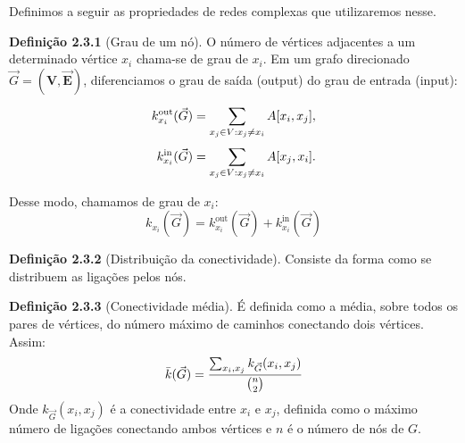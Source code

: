 \documentclass[12pt]{article}
\begin{document}
Definimos a seguir as propriedades de redes complexas que utilizaremos nesse.


\noindent \textbf{Definição 2.3.1} (Grau de um nó). O número de vértices adjacentes a um determinado vértice $x_i$ chama-se de grau de $x_i$. Em um grafo direcionado $\Vec G = (\bm V,\bm \Vec E)$, diferenciamos o grau de saída (output) do grau de entrada (input):
\begin{align}
k^{\text{\text{out}}}_{x_{i}}(\Vec{G}) &= \sum_{x_j \in V : x_j \neq x_i}^{} A[x_i,x_j]
\label{eq:grauOutput}, \\
k^{\text{in}}_{x_{i}}(\Vec{G}) &= \sum_{x_j \in V : x_j \neq x_i}^{} A[x_j,x_i].
\label{eq:grauInput}
\end{align}

Desse modo, chamamos de grau de $x_i$: 
\begin{equation}
k_{x_i}(\Vec{G}) = k^{\text{out}}_{x_{i}}(\Vec{G}) + k^{\text{in}}_{x_{i}}(\Vec{G})
\label{eq:grau}
\end{equation}

\noindent \textbf{Definição 2.3.2} (Distribuição da conectividade). Consiste da forma como se distribuem as ligações pelos nós.

\noindent \textbf{Definição 2.3.3} (Conectividade média). É definida como a média, sobre todos os pares de vértices, do número máximo de caminhos conectando dois vértices. Assim:
\begin{equation}
\Bar{k}(\Vec{G}) = \frac{\sum_{x_i, x_j}^{} k_{\Vec{G}}(x_i, x_j)}{{n \choose 2}}
\label{eq:grauInput}
\end{equation}
Onde $k_{\Vec{G}}(x_i, x_j)$ é a conectividade entre $x_i$ e $x_j$, definida como o máximo número de ligações conectando ambos vértices e $n$ é o número de nós de $G$.
\end{document}
